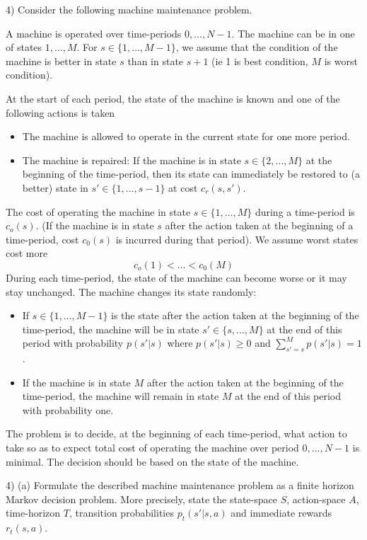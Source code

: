 \documentclass[11pt,a4paper]{article}
\begin{document}
\begin{question}{4)}
  Consider the following machine maintenance problem.
  \par A machine is operated over time-periods $0,\dots,N-1$. The machine can be in one of states $1,\dots,M$. For $s\in\{1,\dots,M-1\}$, we assume that the condition of the machine is better in state $s$ than in state $s+1$ (ie 1 is best condition, $M$ is worst condition).
  \par At the start of each period, the state of the machine is known and one of the following actions is taken
  \begin{itemize}
    \item The machine is allowed to operate in the current state for one more period.
    \item The machine is repaired: If the machine is in state $s\in\{2,\dots,M\}$ at the beginning of the time-period, then its state can immediately be restored to (a better) state in $s'\in\{1,\dots,s-1\}$ at cost $c_r(s,s')$.
  \end{itemize}
  The cost of operating the machine in state $s\in\{1,\dots,M\}$ during a time-period is $c_o(s)$. (If the machine is in state $s$ after the action taken at the beginning of a time-period, cost $c_0(s)$ is incurred during that period). We assume worst states cost more
  \[ c_o(1)<\dots<c_0(M) \]
  During each time-period, the state of the machine can become worse or it may stay unchanged. The machine changes its state randomly:
  \begin{itemize}
    \item If $s\in\{1,\dots,M-1\}$ is the state after the action taken at the beginning of the time-period, the machine will be in state $s'\in\{s,\dots,M\}$ at the end of this period with probability $p(s'|s)$ where $p(s'|s)\geq0$ and $\sum_{s'=s}^Mp(s'|s)=1$.
    \item If the machine is in state $M$ after the action taken at the beginning of the time-period, the machine will remain in state $M$ at the end of this period with probability one.
  \end{itemize}
  \par The problem is to decide, at the beginning of each time-period, what action to take so as to expect total cost of operating the machine over period $0,\dots,N-1$ is minimal. The decision should be based on the state of the machine.
\end{question}

\begin{question}{4) (a)}
  Formulate the described machine maintenance problem as a finite horizon Markov decision problem. More precisely, state the state-space $S$, action-space $A$, time-horizon $T$, transition probabilities $p_t(s'|s,a)$ and immediate rewards $r_t(s,a)$.
\end{question}
\end{document}

